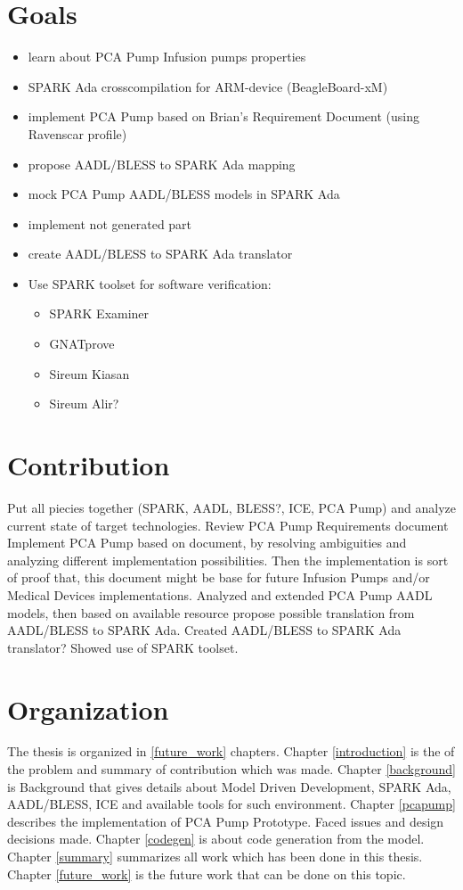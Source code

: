 \section{Goals}
\label{introduction:goals}
\begin{itemize}
	\item learn about PCA Pump Infusion pumps properties
	\item SPARK Ada crosscompilation for ARM-device (BeagleBoard-xM)
	\item implement PCA Pump based on Brian's Requirement Document (using Ravenscar profile)
	\item propose AADL/BLESS to SPARK Ada mapping
	\item mock PCA Pump AADL/BLESS models in SPARK Ada
	\item implement not generated part
	\item create AADL/BLESS to SPARK Ada translator
	\item Use SPARK toolset for software verification:
		\begin{itemize}
			\item SPARK Examiner
			\item GNATprove
			\item Sireum Kiasan
			\item Sireum Alir?
		\end{itemize}
\end{itemize}




\section{Contribution}
\label{introduction:contribution}
Put all piecies together (SPARK, AADL, BLESS?, ICE, PCA Pump) and analyze current state of target technologies.
Review PCA Pump Requirements document
Implement PCA Pump based on document, by resolving ambiguities and analyzing different implementation possibilities. Then the implementation is sort of proof that, this document might be base for future Infusion Pumps and/or Medical Devices implementations.
Analyzed and extended PCA Pump AADL models, then based on available resource propose possible translation from AADL/BLESS to SPARK Ada.
Created AADL/BLESS to SPARK Ada translator?
Showed use of SPARK toolset.


\section{Organization}
\label{introduction:organization}
The thesis is organized in \ref{future_work} chapters. 
Chapter \ref{introduction} is the of the problem and summary of contribution which was made. 
Chapter \ref{background} is Background that gives details about Model Driven Development, SPARK Ada, AADL/BLESS, ICE and available tools for such environment. 
Chapter \ref{pcapump} describes the implementation of PCA Pump Prototype. Faced issues and design decisions made.
Chapter \ref{codegen} is about code generation from the model. 
Chapter \ref{summary} summarizes all work which has been done in this thesis. 
Chapter \ref{future_work} is the future work that can be done on this topic.


